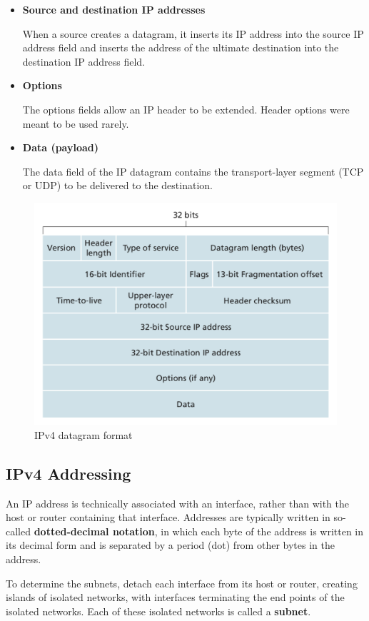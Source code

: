 \documentclass[11pt]{article}
\begin{document}
\begin{itemize}
	  \item \textbf{Source and destination IP addresses}
	  
	  When a source creates a datagram, it inserts its IP address into the source IP address field and inserts the address of the ultimate destination into the destination IP address field.
	  
	  \item \textbf{Options}
	  
	  The options fields allow an IP header to be extended. Header options were meant to be used rarely.
	  
	  \item \textbf{Data (payload)}
	  
	  The data field of the IP datagram contains the transport-layer segment (TCP or UDP) to be delivered to the destination.
	
\end{itemize}

\begin{figure}[h]
	\centering
	\includegraphics[width=0.7\linewidth]{images/ipv4.png}
	\caption{IPv4 datagram format}
	\label{fig:ipv4}
\end{figure}

\subsection{IPv4 Addressing}

An IP address is technically associated with an interface, rather than with the host or router containing that interface. Addresses are typically written in so-called \textbf{dotted-decimal notation}, in which each byte of the address is written in its decimal form and is separated by a period (dot) from other bytes in the address. 

To determine the subnets, detach each interface from its host or router, creating islands of isolated networks, with interfaces terminating the end points of the isolated networks. Each of these isolated networks is called a \textbf{subnet}. 
\end{document}
